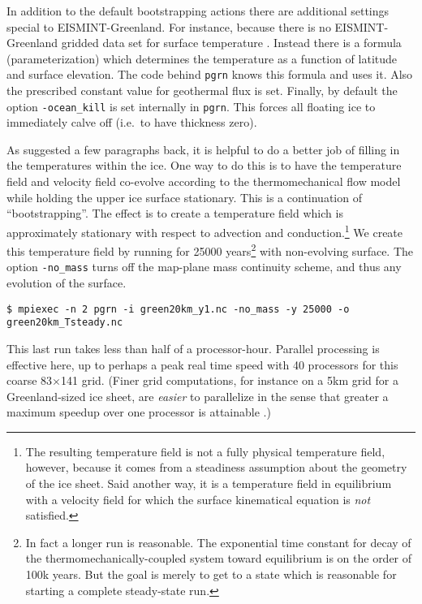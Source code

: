 In addition to the default bootstrapping actions there are additional settings special to EISMINT-Greenland.  For instance, because there is no EISMINT-Greenland gridded data set for surface temperature \cite{RitzEISMINT}.  Instead there is a formula (parameterization) which determines the temperature as a function of latitude and surface elevation.  The code behind \texttt{pgrn} knows this formula and uses it.  Also the prescribed constant value for geothermal flux is set.  Finally, by default the option \texttt{-ocean_kill} is set internally in \texttt{pgrn}.  This forces all floating ice to immediately calve off (i.e.~to have thickness zero).

As suggested a few paragraphs back, it is helpful to do a better job of filling in the temperatures within the ice.  One way to do this is to have the temperature field and velocity field co-evolve according to the thermomechanical flow model while holding the upper ice surface stationary.  This is a continuation of ``bootstrapping''.  The effect is to create a temperature field which is approximately stationary with respect to advection and conduction.\footnote{The resulting temperature field is not a fully physical temperature field, however, because it comes from a steadiness assumption about the geometry of the ice sheet.  Said another way, it is a temperature field in equilibrium with a velocity field for which the surface kinematical equation \cite{Fowler} is \emph{not} satisfied.}  We create this temperature field by running for 25000 years\footnote{In fact a longer run is reasonable.  The exponential time constant for decay of the thermomechanically-coupled system toward equilibrium is on the order of 100k years.  But the goal is merely to get to a state which is reasonable for starting a complete steady-state run.} with non-evolving surface.  The option \texttt{-no_mass} turns off the map-plane mass continuity scheme, and thus any evolution of the surface.

\begin{verbatim}
$ mpiexec -n 2 pgrn -i green20km_y1.nc -no_mass -y 25000 -o green20km_Tsteady.nc
\end{verbatim}%
\noindent This last run takes less than half of a processor-hour.  Parallel processing is effective here, up to perhaps a peak real time speed with 40 processors for this coarse 83$\times$141 grid.  (Finer grid computations, for instance on a 5km grid for a Greenland-sized ice sheet, are \emph{easier} to parallelize in the sense that greater a maximum speedup over one processor is attainable \cite{BBssasliding}.)

